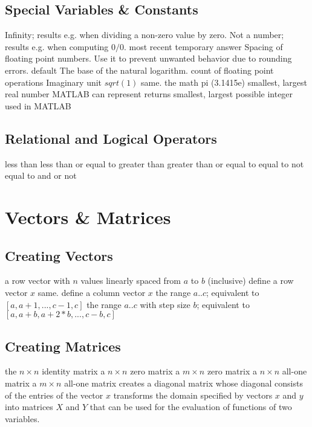 \subsection{Special Variables \& Constants}{}
	{Infinity; results e.g. when dividing a non-zero value by zero.}
	{Not a number; results e.g. when computing $0/0$.}
	{most recent temporary answer}
	{Spacing of floating point numbers. Use it to prevent unwanted behavior due to rounding errors.}
	{default}
	{The base of the natural logarithm.}
	{count of floating point operations}
	{Imaginary unit $sqrt(1)$}
	{same.}
	{the math pi (3.1415e)}
	{smallest, largest real number MATLAB can represent}
	{returns smallest, largest possible integer used in MATLAB}

\subsection{Relational and Logical Operators}{}
\cmdOper{<}	{less than}
\cmdOper{<==}	{less than or equal to}
\cmdOper{>}	{greater than}
\cmdOper{>==}	{greater than or equal to}
\cmdOper{==}	{equal to}
\cmdOper{\tild=}	{not equal to}
\cmdOper{\&}	{and}
\cmdOper{!}	{or}
\cmdOper{\tild}	{not}

\section{Vectors \& Matrices}{}
\subsection{Creating Vectors}{}
	{a row vector with $n$ values linearly spaced from $a$ to $b$ (inclusive)}
	{define a row vector $x$}
	{same.}
	{define a column vector $x$}
	{the range $a..c$; equivalent to $[a,a+1,...,c-1,c]$}
	{the range $a..c$ with step size $b$; equivalent to $[a,a+b,a+2*b,..., c-b,c]$ }

\subsection{Creating Matrices}{}
	{the $n \times n$ identity matrix}
	{a $n \times n$ zero matrix}
	{a $m \times n$ zero matrix}
	{a $n \times n$ all-one matrix}
	{a $m \times n$ all-one matrix}
	{creates a diagonal matrix whose diagonal consists of the entries of the vector $x$}
	{transforms the domain specified by vectors $x$ and $y$ into matrices
    $X$ and $Y$ that can be used for the evaluation of functions of two variables.}

